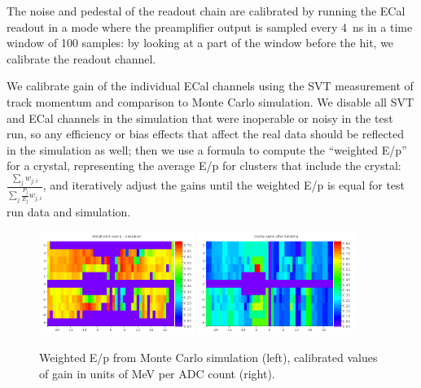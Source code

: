 The noise and pedestal of the readout chain are calibrated by running the ECal readout in a mode where the preamplifier output is sampled every 4~ns in a time window of 100 samples: by looking at a part of the window before the hit, we calibrate the readout channel.

We calibrate gain of the individual ECal channels using the SVT measurement of track momentum and comparison to Monte Carlo simulation. 
We disable all SVT and ECal channels in the simulation that were inoperable or noisy in the test run, so any efficiency or bias effects that affect the real data should be reflected in the simulation as well; then we use a formula to compute the ``weighted E/p'' for a crystal, representing the average E/p for clusters that include the crystal: $\frac{\sum_j w_{j,i}}{\sum_j\frac{P_j}{E_j}w_{j,i}}$, and iteratively adjust the gains until the weighted E/p is equal for test run data and simulation.

\begin{figure}[ht]
	\includegraphics[width=0.45\textwidth]{test2012/ecalperformance/ecalgainplots_corr_sim}
	\includegraphics[width=0.45\textwidth]{test2012/ecalperformance/gains}
	\caption{\small{Weighted E/p from Monte Carlo simulation (left), calibrated values of gain in units of MeV per ADC count (right).}}
	\label{fig:gains}
\end{figure}


